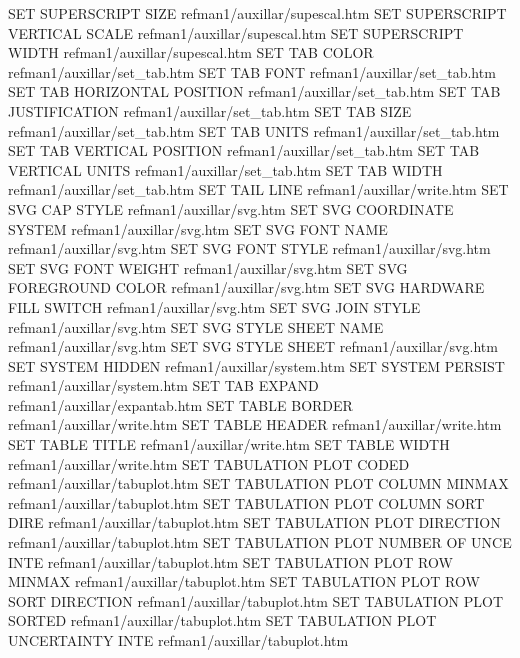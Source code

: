 SET SUPERSCRIPT SIZE                    refman1/auxillar/supescal.htm
SET SUPERSCRIPT VERTICAL SCALE          refman1/auxillar/supescal.htm
SET SUPERSCRIPT WIDTH                   refman1/auxillar/supescal.htm
SET TAB COLOR                           refman1/auxillar/set_tab.htm
SET TAB FONT                            refman1/auxillar/set_tab.htm
SET TAB HORIZONTAL POSITION             refman1/auxillar/set_tab.htm
SET TAB JUSTIFICATION                   refman1/auxillar/set_tab.htm
SET TAB SIZE                            refman1/auxillar/set_tab.htm
SET TAB UNITS                           refman1/auxillar/set_tab.htm
SET TAB VERTICAL POSITION               refman1/auxillar/set_tab.htm
SET TAB VERTICAL UNITS                  refman1/auxillar/set_tab.htm
SET TAB WIDTH                           refman1/auxillar/set_tab.htm
SET TAIL LINE                           refman1/auxillar/write.htm
SET SVG CAP STYLE                       refman1/auxillar/svg.htm
SET SVG COORDINATE SYSTEM               refman1/auxillar/svg.htm
SET SVG FONT NAME                       refman1/auxillar/svg.htm
SET SVG FONT STYLE                      refman1/auxillar/svg.htm
SET SVG FONT WEIGHT                     refman1/auxillar/svg.htm
SET SVG FOREGROUND COLOR                refman1/auxillar/svg.htm
SET SVG HARDWARE FILL SWITCH            refman1/auxillar/svg.htm
SET SVG JOIN STYLE                      refman1/auxillar/svg.htm
SET SVG STYLE SHEET NAME                refman1/auxillar/svg.htm
SET SVG STYLE SHEET                     refman1/auxillar/svg.htm
SET SYSTEM HIDDEN                       refman1/auxillar/system.htm
SET SYSTEM PERSIST                      refman1/auxillar/system.htm
SET TAB EXPAND                          refman1/auxillar/expantab.htm
SET TABLE BORDER                        refman1/auxillar/write.htm
SET TABLE HEADER                        refman1/auxillar/write.htm
SET TABLE TITLE                         refman1/auxillar/write.htm
SET TABLE WIDTH                         refman1/auxillar/write.htm
SET TABULATION PLOT CODED               refman1/auxillar/tabuplot.htm
SET TABULATION PLOT COLUMN MINMAX       refman1/auxillar/tabuplot.htm
SET TABULATION PLOT COLUMN SORT DIRE    refman1/auxillar/tabuplot.htm
SET TABULATION PLOT DIRECTION           refman1/auxillar/tabuplot.htm
SET TABULATION PLOT NUMBER OF UNCE INTE refman1/auxillar/tabuplot.htm
SET TABULATION PLOT ROW MINMAX          refman1/auxillar/tabuplot.htm
SET TABULATION PLOT ROW SORT DIRECTION  refman1/auxillar/tabuplot.htm
SET TABULATION PLOT SORTED              refman1/auxillar/tabuplot.htm
SET TABULATION PLOT UNCERTAINTY INTE    refman1/auxillar/tabuplot.htm

